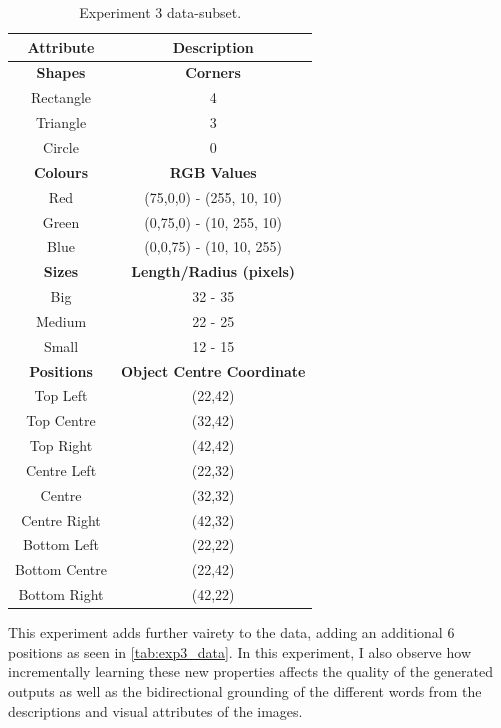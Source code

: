 \begin{table}[h]
\centering
\begin{tabular}{|c|c|}
\hline
\textbf{Attribute} & \textbf{Description} \\ \hline \hline
\textbf{Shapes} & \textbf{Corners} \\ \hline
Rectangle & 4\\ \hline
Triangle & 3\\ \hline
Circle & 0\\ \hline 

\textbf{Colours} & \textbf{RGB Values}	\\ \hline	
Red & (75,0,0) - (255, 10, 10)\\ \hline
Green  & (0,75,0) - (10, 255, 10)\\ \hline
Blue   & (0,0,75) - (10, 10, 255)\\ \hline

\textbf{Sizes} & 	\textbf{Length/Radius (pixels)} \\ \hline			  
Big    & 32 - 35  \\ \hline
Medium & 22 - 25 \\ \hline
Small  & 12 - 15 \\ \hline 

\textbf{Positions} & \textbf{Object Centre Coordinate}	\\ \hline					  
Top Left & (22,42)\\ \hline	
Top Centre & (32,42)\\ \hline
Top Right & (42,42)\\ \hline
Centre Left &(22,32)\\ \hline
Centre & (32,32)\\ \hline
Centre Right &(42,32)\\ \hline
Bottom Left & (22,22)\\ \hline
Bottom Centre & (22,42)\\ \hline
Bottom Right & (42,22)\\ \hline				
\end{tabular}
\caption{Experiment 3 data-subset.}
\label{tab:exp3_data} 
\end{table}

This experiment adds further vairety to the data, adding an additional 6 positions as seen in \autoref{tab:exp3_data}. In this experiment, I also observe how incrementally learning these new properties affects the quality of the generated outputs as well as the bidirectional grounding of the different words from the descriptions and visual attributes of the images. 

